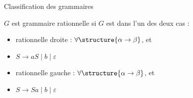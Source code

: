 \begin{frame}{Classification des grammaires}
\begin{description}[xType 0 :]
  \item[Type 3 :] \vspace{2mm}$G$ est grammaire \alert{rationnelle} si $G$ est dans l'un des deux cas :
    \begin{itemize}
    \item \alert{rationnelle droite :} $\forall \structure{\alpha \rightarrow \beta}$,  \structure{$\alpha \in \Gamma$} et 
    \item[\example{Exemple :}] $S \rightarrow aS \mid b \mid \varepsilon$ 
    \end{itemize}
    \begin{itemize}
    \item \alert{rationnelle gauche :} $\forall \structure{\alpha \rightarrow \beta}$,  \structure{$\alpha \in \Gamma$} et 
    \item[\example{Exemple :}] $S \rightarrow Sa \mid b \mid \varepsilon$ 
    \end{itemize}
  \end{description}

\end{frame}

\endgroup
\endinput
